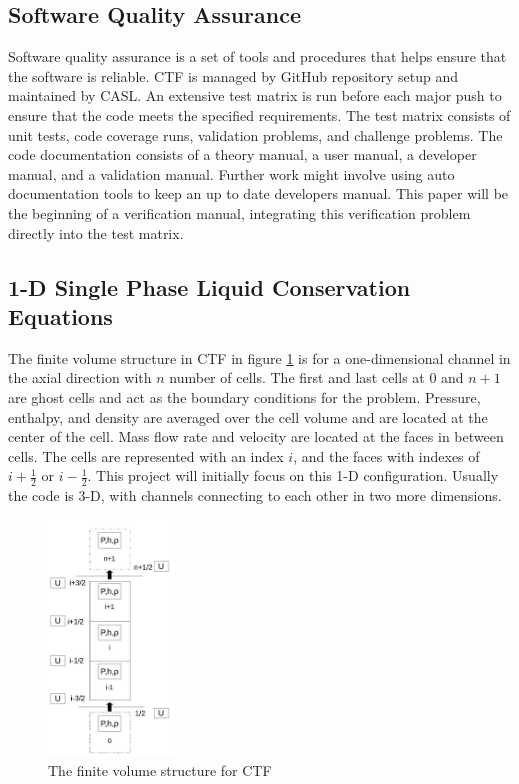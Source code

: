 \documentclass{mc2015}
\begin{document}
\subsection{Software Quality Assurance}

Software quality assurance is a set of tools and procedures that helps
ensure that the software is reliable. CTF is managed by GitHub repository
setup and maintained by CASL. An extensive test matrix is run before each major
push to ensure that the code meets the specified requirements. The test matrix
consists of unit tests, code coverage runs, validation problems, and challenge
problems. The code documentation consists of a theory manual, a user manual, a
developer manual, and a validation manual. Further work might involve using
auto documentation tools to keep an up to date developers manual. This paper
will be the beginning of a verification manual, integrating this verification
problem directly into the test matrix.

\subsection{1-D Single Phase Liquid Conservation Equations}

The finite volume structure in CTF in figure \ref{fig:CTF-Cells} is for a
one-dimensional channel in the axial direction with $n$ number of cells. The
first and last cells at 0 and $n+1$ are ghost cells and act as the boundary
conditions for the problem. Pressure, enthalpy, and density are averaged over
the cell volume and are located at the center of the cell. Mass flow rate and
velocity are located at the faces in between cells. The cells  are represented
with an index $i$, and the faces with indexes of $i + \frac{1}{2}$ or 
$i-\frac{1}{2}$. This project will initially focus on this 1-D configuration.
Usually the code  is 3-D,  with channels connecting to each other in two more 
dimensions.

\begin{figure}[!h]
	\centering
	\includegraphics[width=0.30\textwidth]{images/CTF-Cells}
	\caption{The finite volume structure for CTF}
	\label{fig:CTF-Cells}
\end{figure}
\end{document}
